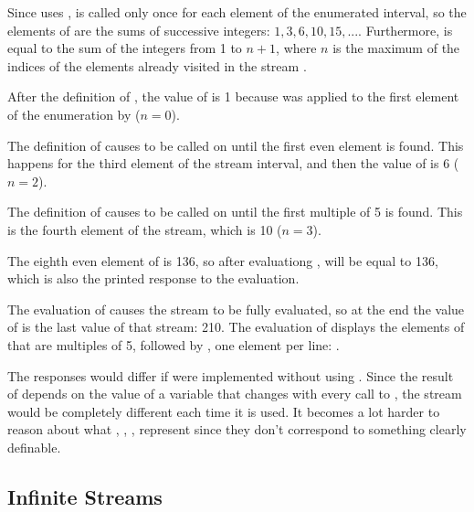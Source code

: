 \begin{exe}[3.52]
    Since  uses ,  is called only once 
    for each element of the enumerated interval, so the elements of  
    are the sums of successive integers: $1, 3, 6, 10, 15, ...$. Furthermore, 
     is equal to the sum of the integers from 1 to $n + 1$, where $n$ 
    is the maximum of the indices of the elements already visited in the stream 
    .

    After the definition of , the value of  is 1 because 
     was applied to the first element of the enumeration by 
     ($n = 0$).

    The definition of  causes  to be called on 
     until the first even element is found. This happens for the third 
    element of the stream interval, and then the value of  is 6 ($n 
    = 2$).

    The definition of  causes  to be called on 
     until the first multiple of 5 is found. This is the fourth 
    element of the stream, which is 10 ($n = 3$).

    The eighth even element of  is 136, so after evaluationg
    ,  will be equal to 136, which is also the 
    printed response to the evaluation.

    The evaluation of  causes the stream  to be 
    fully evaluated, so at the end the value of  is the last value of 
    that stream: 210. The evaluation of  displays the 
    elements of  that are multiples of 5, followed by , one 
    element per line:
    .

    \vspace{\baselineskip}

    The responses would differ if  were implemented without using 
    . Since the result of  depends on the value of 
    a variable that changes with every call to , the stream 
     would be completely different each time it is used. It becomes 
    a lot harder to reason about what , , ,  
    represent since they don’t correspond to something clearly definable.
\end{exe}

\subsection{Infinite Streams}

